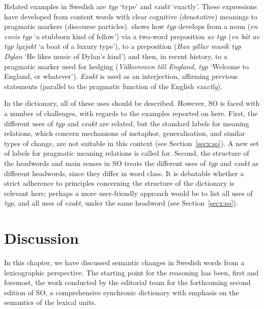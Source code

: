 \documentclass[output=paper]{langscibook}
\begin{document}
Related examples in Swedish are \emph{typ} `type' and \emph{exakt} `exactly'. These expressions have developed from content words with clear cognitive (denotative) meanings to pragmatic markers (discourse particles). \citet{rosenkvist2011} shows how \emph{typ} develops from a noun (\emph{en envis typ} `a stubborn kind of fellow') via a two-word preposition \emph{av typ} (\emph{en båt av typ lyxjakt} `a boat of a luxury type'), to a preposition (\emph{Han gillar musik typ Dylan} `He likes music of Dylan's kind') and then, in recent history, to a pragmatic marker used for hedging (\emph{Välkommen till England, typ} `Welcome to England, or whatever'). \emph{Exakt} is used as an interjection, affirming previous statements (parallel to the pragmatic function of the English \emph{exactly}). 	

In the dictionary, all of these uses should be described. However, SO is faced with a number of challenges, with regards to the examples reported on here. First, the different uses of \emph{typ} and \emph{exakt} are related, but the standard labels for meaning relations, which concern mechanisms of metaphor, generalisation, and similar types of change, are not suitable in this context (see Section~\ref{secx:so}). A new set of labels for pragmatic meaning relations is called for. Second, the structure of the headwords and main senses in SO treats the different uses of \emph{typ} and \emph{exakt} as different headwords, since they differ in word class. It is debatable whether a strict adherence to principles concerning the structure of the dictionary is relevant here; perhaps a more user-friendly approach would be to list all uses of \emph{typ}, and all uses of \emph{exakt}, under the same headword (see Section~\ref{secx:so}). 

\section{Discussion} \label{sec:discussion}\largerpage
In this chapter, we have discussed semantic changes in Swedish words from a lexicographic perspective. The starting point for the reasoning has been, first and foremost, the work conducted by the editorial team for the forthcoming second edition of SO, a comprehensive synchronic dictionary with emphasis on the semantics of the lexical units. 
\end{document}
